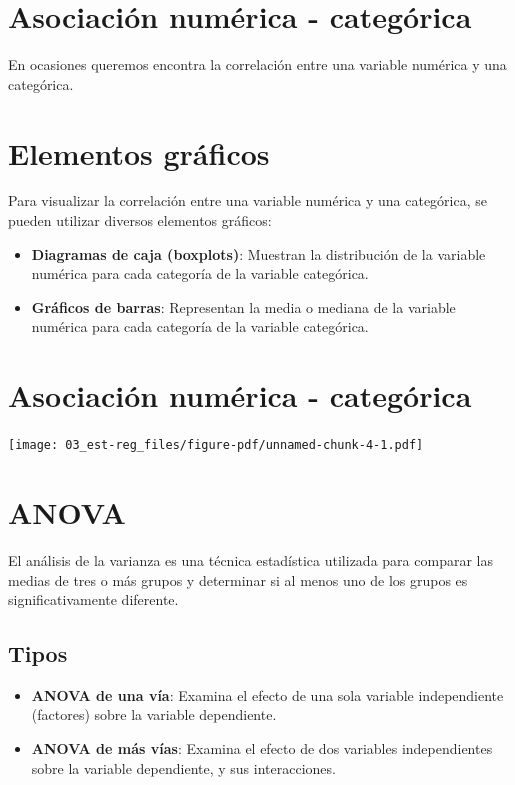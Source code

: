 \documentclass[
  letterpaper,
  DIV=11,
  numbers=noendperiod]{scrreprt}
\providecommand{\tightlist}{%
  \setlength{\itemsep}{0pt}\setlength{\parskip}{0pt}}\usepackage{longtable,booktabs,array}
\begin{document}
\section{Asociación numérica -
categórica}\label{asociaciuxf3n-numuxe9rica---categuxf3rica}

En ocasiones queremos encontra la correlación entre una variable
numérica y una categórica.

\section{Elementos gráficos}\label{elementos-gruxe1ficos}

Para visualizar la correlación entre una variable numérica y una
categórica, se pueden utilizar diversos elementos gráficos:

\begin{itemize}
\tightlist
\item
  \textbf{Diagramas de caja (boxplots)}: Muestran la distribución de la
  variable numérica para cada categoría de la variable categórica.
\item
  \textbf{Gráficos de barras}: Representan la media o mediana de la
  variable numérica para cada categoría de la variable categórica.
\end{itemize}

\section{Asociación numérica -
categórica}\label{asociaciuxf3n-numuxe9rica---categuxf3rica-1}

\texttt{[image: 03\_est-reg\_files/figure-pdf/unnamed-chunk-4-1.pdf]}

\section{ANOVA}\label{anova}

El análisis de la varianza es una técnica estadística utilizada para
comparar las medias de tres o más grupos y determinar si al menos uno de
los grupos es significativamente diferente.

\subsection{Tipos}\label{tipos}

\begin{itemize}
\tightlist
\item
  \textbf{ANOVA de una vía}: Examina el efecto de una sola variable
  independiente (factores) sobre la variable dependiente.
\item
  \textbf{ANOVA de más vías}: Examina el efecto de dos variables
  independientes sobre la variable dependiente, y sus interacciones.
\end{itemize}
\end{document}
